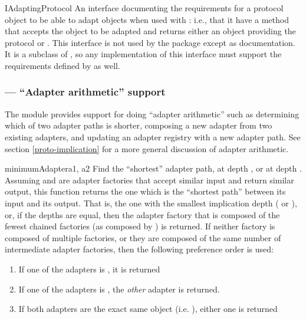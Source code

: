 \begin{verbatim%
}
\begin{verbatim%
}
\begin{verbatim%
}
\begin{verbatim%
}
\begin{verbatim%
}
\begin{verbatim%
}
\begin{classdesc*}{IAdaptingProtocol}
An interface documenting the requirements for a protocol object to be able to
adapt objects when used with : i.e., that it have a
 method that accepts the object to be adapted and returns
either an object providing the protocol or .  This interface is
not used by the  package except as documentation.  It is a
subclass of , so any implementation of this interface must
support the requirements defined by  as well.
\end{classdesc*}
















\subsubsection{ --- ``Adapter arithmetic'' support \label{protocol-adapters-module}}

The  module provides support for doing ``adapter
arithmetic'' such as determining which of two adapter paths is shorter,
composing a new adapter from two existing adapters, and updating an adapter
registry with a new adapter path.  See section \ref{proto-implication} for a
more general discussion of adapter arithmetic.

\begin{funcdesc}{minimumAdapter}{a1, a2 }
Find the ``shortest'' adapter path,  at depth , or  at
depth .  Assuming  and  are adapter factories that
accept similar input and return similar output, this function returns the one
which is the ``shortest path'' between its input and its output.  That is, the
one with the smallest implication depth ( or ), or, if the
depths are equal, then the adapter factory that is composed of the fewest
chained factories (as composed by ) is returned.
If neither factory is composed of multiple factories, or they are composed of
the same number of intermediate adapter factories, then the following
preference order is used:

\begin{enumerate}
\item If one of the adapters is , it is returned
\item If one of the adapters is , the \emph{other}
adapter is returned.
\item If both adapters are the exact same object (i.e. ), either
one is returned
\end{enumerate}


\end{funcdesc}
\end{verbatim%
}
\end{verbatim%
}
\end{verbatim%
}
\end{verbatim%
}
\end{verbatim%
}
\end{verbatim%
}
